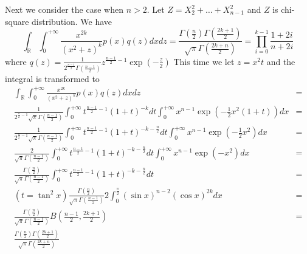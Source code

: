 \documentclass{article}
\def\R{\mathbb{R}}
\begin{document}
Next we consider the case when $n>2$. Let $Z = X_2^2 + \dots + X_{n-1}^2$ and $Z$ is chi-square distribution. We have
\begin{equation}\label{eq:n3}
\int_{\R}\int_{0}^{+\infty} \frac{x^{2k}}{(x^2+z)^k} p(x)q(z)dxdz = \frac{\Gamma(\frac{n}{2}) \Gamma(\frac{2k+1}{2})}{\sqrt{\pi} \Gamma(\frac{2k+n}{2})} = \prod_{i=0}^{k-1} \frac{1+2i}{n+2i}
\end{equation}
where $q(z) = \frac{1}{2^{\frac{n-1}{2}}\Gamma(\frac{n-1}{2})} z ^{\frac{n-1}{2} - 1} \exp(-\frac{z}{2})$
This time we let $z=x^2 t$ and the integral is transformed to
\begin{align*}
\int_{\R}\int_{0}^{+\infty} \frac{x^{2k}}{(x^2+z)^k} p(x)q(z)dxdz & = \\
\frac{1}{2^{\frac{n}{2}-1}\sqrt{\pi}\Gamma(\frac{n-1}{2})} \int_{0}^{+\infty}t^{\frac{n-1}{2}-1}(1+t)^{-k}dt\int_{0}^{+\infty}x^{n-1} \exp(-\frac{1}{2}x^2(1+t)) dx &=
\\
\frac{1}{2^{\frac{n}{2}-1}\sqrt{\pi}\Gamma(\frac{n-1}{2})} \int_{0}^{+\infty}t^{\frac{n-1}{2}-1}(1+t)^{-k-\frac{n}{2}}dt\int_{0}^{+\infty}x^{n-1} \exp(-\frac{1}{2}x^2) dx &=
\\
\frac{2}{\sqrt{\pi}\Gamma(\frac{n-1}{2})} \int_{0}^{+\infty}t^{\frac{n-1}{2}-1}(1+t)^{-k-\frac{n}{2}}dt\int_{0}^{+\infty}x^{n-1} \exp(-x^2) dx &=
\\
\frac{\Gamma(\frac{n}{2})}{\sqrt{\pi}\Gamma(\frac{n-1}{2})} \int_{0}^{+\infty}t^{\frac{n-1}{2}-1}(1+t)^{-k-\frac{n}{2}}dt
&= \\ (t=\tan^2 x) \frac{\Gamma(\frac{n}{2})}{\sqrt{\pi}\Gamma(\frac{n-1}{2})} 2 \int_0^{\frac{\pi}{2}} (\sin x)^{n-2} (\cos x)^{2k} dx
&= \\ \frac{\Gamma(\frac{n}{2})}{\sqrt{\pi}\Gamma(\frac{n-1}{2})} B(\frac{n-1}{2}, \frac{2k+1}{2})
&= \\ \frac{\Gamma(\frac{n}{2}) \Gamma(\frac{2k+1}{2})}{\sqrt{\pi} \Gamma(\frac{2k+n}{2})}
\end{align*}
\end{document}
